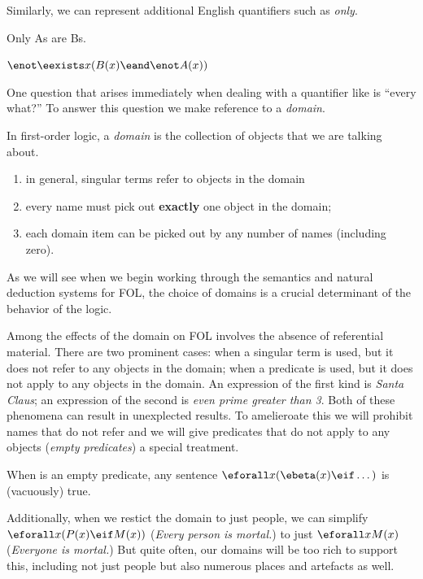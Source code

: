 Similarly, we can represent additional English quantifiers such as \emph{only}.

\begin{argument}
\item[ ] Only As are Bs.
\item[ ] $\enot\eexists x(B(x)\eand\enot A(x))$
\end{argument}

One question that arises immediately when dealing with a quantifier like
\eforall is ``every what?'' To answer this question we make reference to a
\emph{domain}.

\begin{definition}
  \label{def:fol-domain-informal}
  In first-order logic, a \emph{domain} is the collection of objects that we
  are talking about.
  \begin{enumerate}
  \item in general, singular terms refer to objects in the domain
  \item every name must pick out \textbf{exactly} one object in the domain;
  \item each domain item can be picked out by any number of names (including
    zero).
  \end{enumerate}
\end{definition}

As we will see when we begin working through the semantics and natural deduction
systems for FOL, the choice of domains is a crucial determinant of the behavior
of the logic.

Among the effects of the domain on FOL involves the absence of referential
material. There are two prominent cases: when a singular term is used, but
it does not refer to any objects in the domain; when a predicate is used, but
it does not apply to any objects in the domain. An expression of the first kind
is \emph{Santa Claus}; an expression of the second is \emph{even prime greater
than 3}. Both of these phenomena can result in unexplected results. To
amelieroate this we will prohibit names that do not refer and we will give
predicates that do not apply to any objects (\emph{empty predicates}) a special
treatment.

\begin{definition}
  When \ebeta is an empty predicate, any sentence
  $\eforall x(\ebeta(x)\eif\dots)$ is (vacuously) true.
\end{definition}

Additionally, when we restict the domain to just people, we can simplify
$\eforall x(P(x)\eif M(x))$ (\emph{Every person is mortal.}) to just
$\eforall xM(x)$ (\emph{Everyone is mortal.}) But quite often, our domains
will be too rich to support this, including not just people but also numerous
places and artefacts as well.

